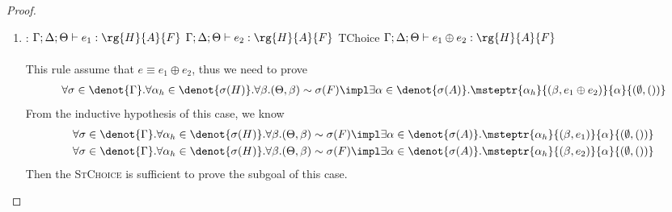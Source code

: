 \begin{proof}
\begin{enumerate}[label=Case]
\item:
{\footnotesize
\mprooftr{21mm}
{
$\Gamma; \Delta; \Theta \vdash e_1 : \rg{H}{A}{F}$ \quad $\Gamma; \Delta; \Theta \vdash e_2 : \rg{H}{A}{F}$
 }
{TChoice}
{$\Gamma; \Delta; \Theta \vdash e_1 \oplus e_2 : \rg{H}{A}{F}$}
\ \\ \ \\}
This rule assume that $e \equiv e_1 \oplus e_2$, thus we need to prove
{\footnotesize\begin{align*}
 \forall \sigma \in \denot{\Gamma}.\forall \alpha_h \in \denot{\sigma(H)}. \forall \beta. (\Theta, \beta) \sim \sigma(F) \impl \exists \alpha \in\denot{\sigma(A)}. \msteptr{\alpha_h}{(\beta, e_1 \oplus e_2)}{\alpha}{(\emptyset, ())}
\end{align*}}\noindent
From the inductive hypothesis of this case, we know
{\footnotesize\begin{align*}
    & \forall \sigma \in \denot{\Gamma}.\forall \alpha_h \in \denot{\sigma(H)}. \forall \beta. (\Theta, \beta) \sim \sigma(F) \impl \exists \alpha \in\denot{\sigma(A)}. \msteptr{\alpha_h}{(\beta, e_1)}{\alpha}{(\emptyset, ())}
    \\& \forall \sigma \in \denot{\Gamma}.\forall \alpha_h \in \denot{\sigma(H)}. \forall \beta. (\Theta, \beta) \sim \sigma(F) \impl \exists \alpha \in\denot{\sigma(A)}. \msteptr{\alpha_h}{(\beta, e_2)}{\alpha}{(\emptyset, ())}
\end{align*}}\noindent
Then the \textsc{StChoice} is sufficient to prove the subgoal of this case.


\end{enumerate}
\end{proof}
